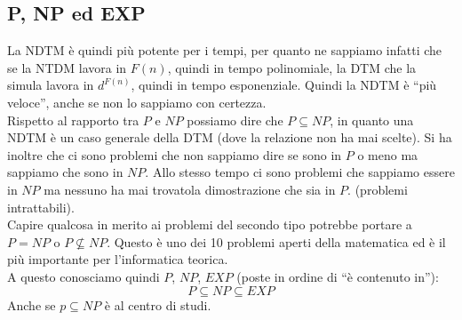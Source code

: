 \subsection{P, NP ed EXP}
La NDTM è quindi più potente per i tempi, per quanto ne sappiamo infatti che se
la NTDM lavora in $F(n)$, quindi in tempo polinomiale, la DTM che la simula
lavora in $d^{F(n)}$, quindi in tempo esponenziale. Quindi la NDTM è ``più
veloce'', anche se non lo sappiamo con certezza.\\
Rispetto al rapporto tra $P$ e $NP$ possiamo dire che $P\subseteq NP$, in quanto
una NDTM è un caso generale della DTM (dove la relazione non ha mai scelte). Si
ha inoltre che ci sono problemi che non sappiamo dire se sono in $P$ o meno ma sappiamo che sono in $NP$. Allo stesso tempo ci sono problemi che sappiamo essere in $NP$ ma nessuno ha mai trovatola dimostrazione che sia in $P$. (problemi intrattabili).\\
Capire qualcosa in merito ai problemi del secondo tipo potrebbe portare a $P=NP$
o $P\not\subseteq NP$. Questo è uno dei 10 problemi aperti della matematica ed è
il più importante per l'informatica teorica.\\
A questo conosciamo quindi $P$, $NP$, $EXP$ (poste in ordine di ``è contenuto
in''):
\[P\subseteq NP \subseteq EXP\]
Anche se $p\subseteq NP$ è al centro di studi.\\
